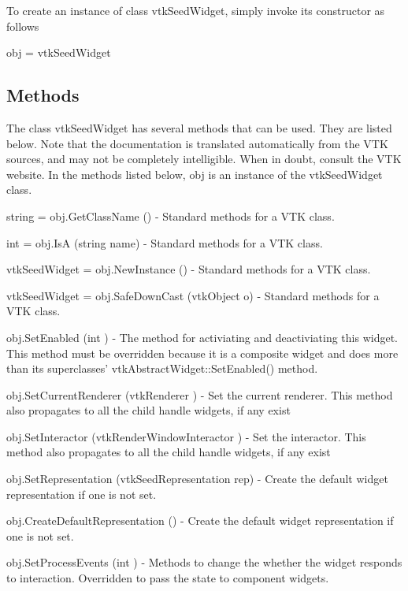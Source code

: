 To create an instance of class vtk\-Seed\-Widget, simply invoke its constructor as follows \begin{DoxyVerb}  obj = vtkSeedWidget
\end{DoxyVerb}
 \hypertarget{vtkwidgets_vtkxyplotwidget_Methods}{}\subsection{Methods}\label{vtkwidgets_vtkxyplotwidget_Methods}
The class vtk\-Seed\-Widget has several methods that can be used. They are listed below. Note that the documentation is translated automatically from the V\-T\-K sources, and may not be completely intelligible. When in doubt, consult the V\-T\-K website. In the methods listed below, {\ttfamily obj} is an instance of the vtk\-Seed\-Widget class. 
\begin{DoxyItemize}
\item {\ttfamily string = obj.\-Get\-Class\-Name ()} -\/ Standard methods for a V\-T\-K class.  
\item {\ttfamily int = obj.\-Is\-A (string name)} -\/ Standard methods for a V\-T\-K class.  
\item {\ttfamily vtk\-Seed\-Widget = obj.\-New\-Instance ()} -\/ Standard methods for a V\-T\-K class.  
\item {\ttfamily vtk\-Seed\-Widget = obj.\-Safe\-Down\-Cast (vtk\-Object o)} -\/ Standard methods for a V\-T\-K class.  
\item {\ttfamily obj.\-Set\-Enabled (int )} -\/ The method for activiating and deactiviating this widget. This method must be overridden because it is a composite widget and does more than its superclasses' vtk\-Abstract\-Widget\-::\-Set\-Enabled() method.  
\item {\ttfamily obj.\-Set\-Current\-Renderer (vtk\-Renderer )} -\/ Set the current renderer. This method also propagates to all the child handle widgets, if any exist  
\item {\ttfamily obj.\-Set\-Interactor (vtk\-Render\-Window\-Interactor )} -\/ Set the interactor. This method also propagates to all the child handle widgets, if any exist  
\item {\ttfamily obj.\-Set\-Representation (vtk\-Seed\-Representation rep)} -\/ Create the default widget representation if one is not set.  
\item {\ttfamily obj.\-Create\-Default\-Representation ()} -\/ Create the default widget representation if one is not set.  
\item {\ttfamily obj.\-Set\-Process\-Events (int )} -\/ Methods to change the whether the widget responds to interaction. Overridden to pass the state to component widgets.  

\end{DoxyItemize}
